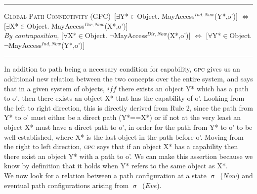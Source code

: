 \documentclass[a4paper,11pt, twoside,twocolumn]{article}
\newenvironment{logic}[1][null]
{\begin{flushleft} \small \label{#1}}
{\end{flushleft}}
\newcommand{\loin}{$\in$}
\newcommand{\loforall}{$\forall$}
\newcommand{\loexists}{$\exists$}
\newcommand{\losigma}{$\upsigma$}
\newcommand{\loiff} {$\iff$}
\newcommand{\loneg}{$\neg$}
\newcommand{\ablock} {\null\qquad}
\begin{document}
\begin{logic}
\hrule\null
\textsc{\normalsize *Global Path Connectivity (GPC)}\
$[$\loexists Y*\loin{Object}. MayAccess$^{Ind,Now}$(Y*,o')$]$ \loiff\linebreak
\ablock $[$\loexists X*\loin{Object}. MayAccess$^{Dir,Now}$(X*,o')$]$
\linebreak\\
\textit{By contraposition,}\linebreak
$[$\loforall X*\loin{Object}. \loneg MayAccess$^{Dir,Now}$(X*,o')$]$ \loiff\linebreak
\ablock $[$\loforall Y*\loin{Object}. \loneg MayAccess$^{Ind,Now}$(Y*,o')$]$\linebreak
\hrule
\end{logic}
In addition to path being a necessary condition for capability, \textsc{gpc} gives us an additional new relation between the two concepts over the entire system, and says that in a given system of objects, $iff$ there exists an object Y* which has a path to o', then there exists an object X* that has the capability of o'. Looking from the left to right direction, this is directly derived from Rule 2, since the path from Y* to o' must either be a direct path (Y*==X*) or if not at the very least an object X* must have a direct path to o', in order for the path from Y* to o' to be well-established, where X* is the last object in the path before o'. Moving from the right to left direction, \textsc{gpc} says that if an object X* has a capability then there exist an object Y* with a path to o'. We can make this assertion because we know by definition that it holds when Y* refers to the same object as X*.\\

We now look for a relation between a path configuration at a state \losigma\ ($Now$) and eventual path configurations arising from \losigma\ ($Eve$).
\end{document}

